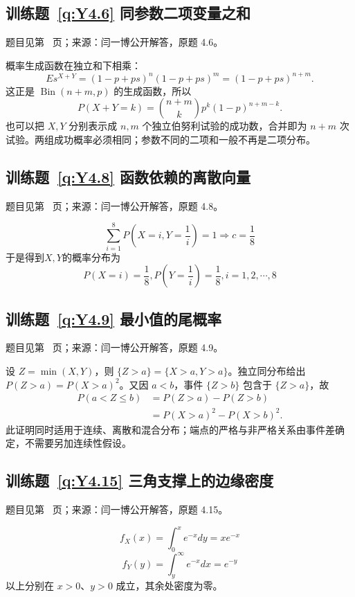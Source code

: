 \subsection*{训练题~\ref{q:Y4.6} 同参数二项变量之和}\label{a:Y4.6}{\small 题目见第~\pageref{q:Y4.6} 页；来源：闫一博公开解答，原题 4.6。}
\begin{solve}概率生成函数在独立和下相乘：\[E s^{X+Y}=(1-p+ps)^n(1-p+ps)^m=(1-p+ps)^{n+m}.\]这正是 $\operatorname{Bin}(n+m,p)$ 的生成函数，所以\[P(X+Y=k)=\binom{n+m}{k}p^k(1-p)^{n+m-k}.\]也可以把 $X,Y$ 分别表示成 $n,m$ 个独立伯努利试验的成功数，合并即为 $n+m$ 次试验。两组成功概率必须相同；参数不同的二项和一般不再是二项分布。\end{solve}

\subsection*{训练题~\ref{q:Y4.8} 函数依赖的离散向量}\label{a:Y4.8}{\small 题目见第~\pageref{q:Y4.8} 页；来源：闫一博公开解答，原题 4.8。}
\begin{solve}
    \[\sum\limits_{i = 1}^8 {P(X = i,Y = \frac{1}{i})}  = 1 \Rightarrow c = \frac{1}{8}\]
    于是得到$X,Y$的概率分布为
    \[P(X = i) = \frac{1}{8},P(Y = \frac{1}{i}) = \frac{1}{8},i = 1,2, \cdots ,8\]
\end{solve}

\subsection*{训练题~\ref{q:Y4.9} 最小值的尾概率}\label{a:Y4.9}{\small 题目见第~\pageref{q:Y4.9} 页；来源：闫一博公开解答，原题 4.9。}
\begin{solve}设 $Z=\min(X,Y)$，则 $\{Z>a\}=\{X>a,Y>a\}$。独立同分布给出 $P(Z>a)=P(X>a)^2$。又因 $a<b$，事件 $\{Z>b\}$ 包含于 $\{Z>a\}$，故\[\begin{aligned}P(a<Z\le b)&=P(Z>a)-P(Z>b)\\&=P(X>a)^2-P(X>b)^2.\end{aligned}\]此证明同时适用于连续、离散和混合分布；端点的严格与非严格关系由事件差确定，不需要另加连续性假设。\end{solve}

\subsection*{训练题~\ref{q:Y4.15} 三角支撑上的边缘密度}\label{a:Y4.15}{\small 题目见第~\pageref{q:Y4.15} 页；来源：闫一博公开解答，原题 4.15。}
\begin{solve}
\[{f_X}(x) = \int_0^x {{e^{ - x}}dy}  = x{e^{ - x}}\]
    \[{f_Y}(y) = \int_y^\infty  {{e^{ - x}}dx}  = {e^{ - y}}\]
 以上分别在 $x>0$、$y>0$ 成立，其余处密度为零。\end{solve}

